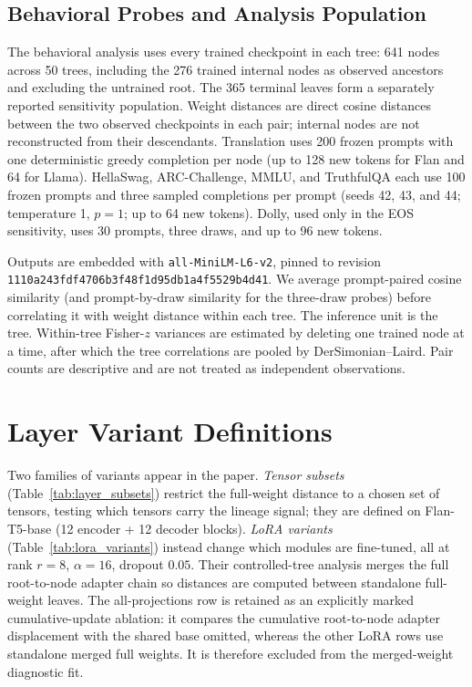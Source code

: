 \documentclass{article}
\theoremstyle{definition}
\theoremstyle{plain}
\begin{document}
\subsection*{Behavioral Probes and Analysis Population}
The behavioral analysis uses every trained checkpoint in each tree: 641 nodes across 50
trees, including the 276 trained internal nodes as observed ancestors and excluding the untrained root.
The 365 terminal leaves form a separately reported sensitivity population. Weight distances are direct
cosine distances between the two observed checkpoints in each pair; internal nodes are not reconstructed
from their descendants. Translation uses 200 frozen prompts with one deterministic greedy completion per
node (up to 128 new tokens for Flan and 64 for Llama). HellaSwag, ARC-Challenge, MMLU, and TruthfulQA
each use 100 frozen prompts and three sampled completions per prompt (seeds 42, 43, and 44; temperature
1, $p=1$; up to 64 new tokens). Dolly, used only in the EOS sensitivity, uses 30 prompts, three draws,
and up to 96 new tokens.

Outputs are embedded with \texttt{all-MiniLM-L6-v2}, pinned to revision
\texttt{1110a243fdf4706b3f48f1d95db1a4f5529b4d41}. We average prompt-paired cosine similarity (and
prompt-by-draw similarity for the three-draw probes) before correlating it with weight distance within
each tree. The inference unit is the tree. Within-tree Fisher-$z$ variances are estimated by deleting one
trained node at a time, after which the tree correlations are pooled by DerSimonian--Laird. Pair counts
are descriptive and are not treated as independent observations.

\section{Layer Variant Definitions}
\label{app:layers}
Two families of variants appear in the paper. \emph{Tensor subsets} (Table~\ref{tab:layer_subsets})
restrict the full-weight distance to a chosen set of tensors, testing which tensors carry the lineage
signal; they are defined on Flan-T5-base (12 encoder + 12 decoder blocks). \emph{LoRA variants}
(Table~\ref{tab:lora_variants}) instead change which modules are fine-tuned, all at rank $r=8$,
$\alpha=16$, dropout $0.05$. Their controlled-tree analysis merges the full
root-to-node adapter chain so distances are computed between standalone full-weight leaves. The
all-projections row is retained as an explicitly marked cumulative-update ablation: it compares the
cumulative root-to-node adapter displacement with the shared base omitted, whereas the other LoRA rows
use standalone merged full weights. It is therefore excluded from the merged-weight diagnostic fit.
\end{document}
